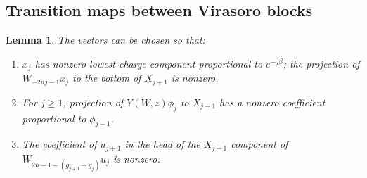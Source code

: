 \documentclass[11pt]{article}
\newtheorem{lemma}[theorem]{Lemma}
\numberwithin{equation}{section}
\begin{document}
\subsection{Transition maps between Virasoro blocks}
\begin{lemma}\label{B:couplings}
The vectors can be chosen so that:
\begin{enumerate}[label=(\alph*),leftmargin=7mm]
\item $x_j$ has nonzero lowest-charge component proportional to $e^{-j\beta}$; the projection of $W_{-2nj-1}x_j$ to the bottom of $X_{j+1}$ is nonzero.
\item For $j\geq1$, projection of $Y(W,z)\phi_j$ to $X_{j-1}$ has a nonzero coefficient proportional to $\phi_{j-1}$.
\item The coefficient of $u_{j+1}$ in the head of the $X_{j+1}$ component of $W_{2n-1-(g_{j+1}-g_j)}u_j$ is nonzero.
\end{enumerate}
\end{lemma}
\end{document}
